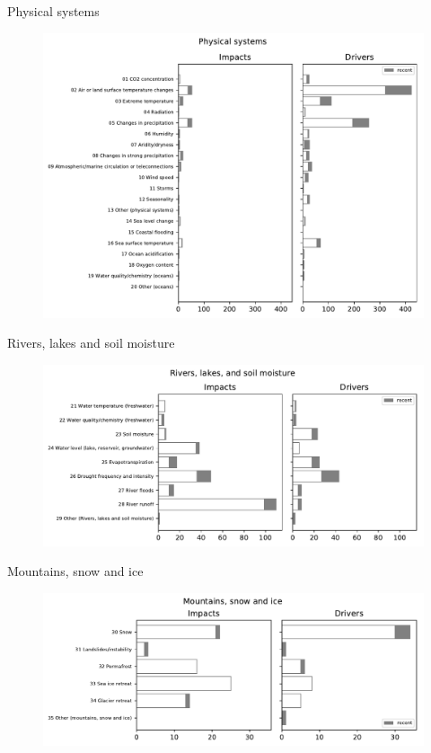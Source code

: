 \documentclass[9pt]{beamer}
\begin{document}
\begin{frame}[label=Phy]{Physical systems}
\begin{figure}
	\includegraphics[width=\linewidth]{../plots/progress/cats_labels_Physical_systems.pdf}
\end{figure}
\end{frame}

\begin{frame}[label=Riv]{Rivers, lakes and soil moisture}
\begin{figure}
	\includegraphics[width=\linewidth]{../plots/progress/cats_labels_Rivers,_lakes,_and_soil_moisture.pdf}
\end{figure}
\end{frame}

\begin{frame}[label=Moun]{Mountains, snow and ice}
\begin{figure}
	\includegraphics[width=\linewidth]{../plots/progress/cats_labels_Mountains,_snow_and_ice.pdf}
\end{figure}
\end{frame}
\end{document}
